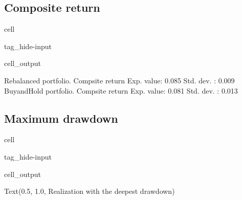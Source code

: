 \documentclass[letterpaper,10pt,english]{jupyterBook}
\begin{document}
\subsection{Composite return}
\label{\detokenize{code/notebooks/rebalancing:composite-return}}
\begin{sphinxuseclass}{cell}
\begin{sphinxuseclass}{tag_hide-input}\begin{sphinxVerbatimOutput}

\begin{sphinxuseclass}{cell_output}
\begin{sphinxVerbatim}[commandchars=\\\{\}]
Rebalanced portfolio. Compsite return
 Exp. value: 0.085
 Std. dev. : 0.009
Buy\PYGZhy{}and\PYGZhy{}Hold portfolio. Compsite return
 Exp. value: 0.081
 Std. dev. : 0.013
\end{sphinxVerbatim}

\noindent{}

\end{sphinxuseclass}\end{sphinxVerbatimOutput}

\end{sphinxuseclass}
\end{sphinxuseclass}

\subsection{Maximum drawdown}
\label{\detokenize{code/notebooks/rebalancing:maximum-drawdown}}
\begin{sphinxuseclass}{cell}
\begin{sphinxuseclass}{tag_hide-input}\begin{sphinxVerbatimOutput}

\begin{sphinxuseclass}{cell_output}
\begin{sphinxVerbatim}[commandchars=\\\{\}]
Text(0.5, 1.0, \PYGZsq{}Realization with the deepest drawdown\PYGZsq{})
\end{sphinxVerbatim}

\noindent{}

\end{sphinxuseclass}\end{sphinxVerbatimOutput}

\end{sphinxuseclass}
\end{sphinxuseclass}
\sphinxstepscope
\end{document}
